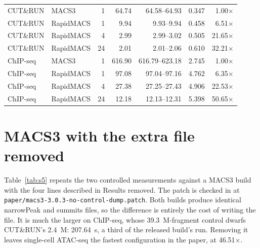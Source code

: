 \documentclass[10pt]{article}
\begin{document}
\begin{table}[h]
\begin{tabular}{@{}llrrrrr@{}}
\addlinespace
CUT\&RUN & MACS3     & 1  &  64.74 &  64.58--64.93  & 0.347 & 1.00$\times$ \\
CUT\&RUN & RapidMACS & 1  &   9.94 &   9.93--9.94   & 0.458 & 6.51$\times$ \\
CUT\&RUN & RapidMACS & 4  &   2.99 &   2.99--3.02   & 0.505 & 21.65$\times$ \\
CUT\&RUN & RapidMACS & 24 &   2.01 &   2.01--2.06   & 0.610 & 32.21$\times$ \\
\addlinespace
ChIP-seq & MACS3     & 1  & 616.90 & 616.79--623.18 & 2.745 & 1.00$\times$ \\
ChIP-seq & RapidMACS & 1  &  97.08 &  97.04--97.16  & 4.762 & 6.35$\times$ \\
ChIP-seq & RapidMACS & 4  &  27.38 &  27.25--27.43  & 4.906 & 22.53$\times$ \\
ChIP-seq & RapidMACS & 24 &  12.18 &  12.13--12.31  & 5.398 & 50.65$\times$ \\
\bottomrule
\end{tabular}
\end{table}

\section{MACS3 with the extra file removed}
Table~\ref{tab:s5} repeats the two controlled measurements against a MACS3 build with the four lines described in Results removed. The patch is checked in at \texttt{paper/\allowbreak macs3-3.0.3-\allowbreak no-control-dump.patch}. Both builds produce identical narrowPeak and summits files, so the difference is entirely the cost of writing the file. It is much the larger on ChIP-seq, whose 39.3~M-fragment control dwarfs CUT\&RUN's 2.4~M: 207.64~s, a third of the released build's run. Removing it leaves single-cell ATAC-seq the fastest configuration in the paper, at 46.51$\times$.
\end{document}
